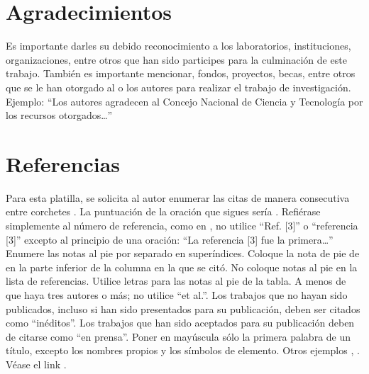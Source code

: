     \section{Agradecimientos}
    
    Es importante darles su debido reconocimiento a los laboratorios, instituciones, organizaciones, entre otros que han sido participes para la culminación de este trabajo. También es importante mencionar, fondos, proyectos, becas, entre otros que se le han otorgado al o los autores para realizar el trabajo de investigación. Ejemplo: “Los autores agradecen al Concejo Nacional de Ciencia y Tecnología por los recursos otorgados…”
    
    \section*{Referencias}
    
    Para esta platilla, se solicita al autor enumerar las citas de manera consecutiva entre corchetes \cite{YLi2013}. 
    La puntuación de la oración que sigues sería \cite{Mesaelides2011}. 
    Refiérase simplemente al número de referencia, como en \cite{Morales2012}, no utilice “Ref. [3]” o “referencia [3]” excepto al principio de una oración: “La referencia [3] fue la primera…”
    Enumere las notas al pie por separado en superíndices. Coloque la nota de pie de en la parte inferior de la columna en la que se citó. No coloque notas al pie en la lista de referencias. Utilice letras para las notas al pie de la tabla.
    A menos de que haya tres autores o más; no utilice “et al.”. Los trabajos que no hayan sido publicados, incluso si han sido presentados para su publicación, deben ser citados como “inéditos”. Los trabajos que han sido aceptados para su publicación deben de citarse como “en prensa”. Poner en mayúscula sólo la primera palabra de un título, excepto los nombres propios y los símbolos de elemento. 
    Otros ejemplos \cite{LAAngeles2021}, \cite{LAAngelesConni}. 
    Véase el link \cite{prueba}.
    
    
    
